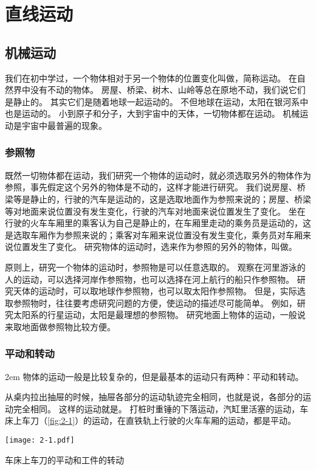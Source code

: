 \chapter{直线运动}\label{chp:linear_movement}

\section{机械运动}
我们在初中学过，一个物体相对于另一个物体的位置变化叫做，简称运动。
在自然界中没有不动的物体。
房屋、桥梁、树木、山岭等总在原地不动，我们说它们是静止的。
其实它们是随着地球一起运动的。
不但地球在运动，太阳在银河系中也是运动的。
小到原子和分子，大到宇宙中的天体，一切物体都在运动。
机械运动是宇宙中最普遍的现象。

\subsection{参照物} 
既然一切物体都在运动，我们研究一个物体的运动时，就必须选取另外的物体作为参照，事先假定这个另外的物体是不动的，这样才能进行研究。
我们说房屋、桥梁等是静止的，行驶的汽车是运动的，这是选取地面作为参照来说的；房屋、桥梁等对地面来说位置没有发生变化，行驶的汽车对地面来说位置发生了变化。
坐在行驶的火车车厢里的乘客认为自己是静止的，在车厢里走动的乘务员是运动的，这是选取车厢作为参照来说的；乘客对车厢来说位置没有发生变化，乘务员对车厢来说位置发生了变化。
研究物体的运动时，选来作为参照的另外的物体，叫做。

原则上，研究一个物体的运动时，参照物是可以任意选取的。
观察在河里游泳的人的运动，可以选择河岸作参照物，也可以选择在河上航行的船只作参照物。
研究天体的运动时，可以取地球作参照物，也可以取太阳作参照物。
但是，实际选取参照物时，往往要考虑研究问题的方便，使运动的描述尽可能简单。
例如，研究太阳系的行星运动，太阳是最理想的参照物。
研究地面上物体的运动，一般说来取地面做参照物比较方便。

\subsection{平动和转动}
\par\medskip\noindent
\begin{minipage}{0.5\linewidth}\parindent2em
物体的运动一般是比较复杂的，但是最基本的运动只有两种：平动和转动。

从桌内拉出抽屉的时候，抽屉各部分的运动轨迹完全相同，也就是说，各部分的运动完全相同。
这样的运动就是。
打桩时重锤的下落运动，汽缸里活塞的运动，车床上车刀（\cref{fig:2-1}）的运动，在直铁轨上行驶的火车车厢的运动，都是平动。
\end{minipage}\hfill
\begin{minipage}{0.45\linewidth}\centering
\begin{figurehere}
  \texttt{[image: 2-1.pdf]}
  \caption{车床上车刀的平动和工件的转动}\label{fig:2-1}
\end{figurehere}
\end{minipage}

